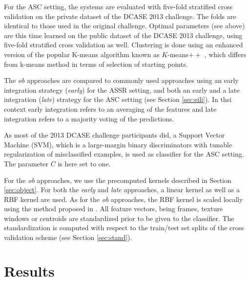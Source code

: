 \documentclass[journal]{IEEEtran}
\begin{document}
For the ASC setting, the systems are evaluated  with five-fold  stratified cross validation on the private dataset of the DCASE 2013 challenge. The folds are identical to those used in the original challenge. Optimal parameters (see above) are this time learned on the public dataset of the DCASE 2013 challenge, using five-fold  stratified cross validation as well. Clustering is done using an enhanced version of the popular K-means algorithm known as $K$-means$++$ \cite{arthur2007k}, which differs from k-means method in terms of selection of starting points. 

The \emph{ob} approaches are compared to commonly used approaches using an early integration strategy (\emph{early}) for the ASSR setting, and both an early and a late integration (\emph{late}) strategy for the ASC setting (see Section \ref{sec:eili}). In thsi context early integration refers to an averaging of the features and late integration refers to a majority voting of the predictions.

As most of the 2013 DCASE challenge participants did, a Support Vector Machine (SVM), which is a large-margin binary discriminators with tunable regularization of misclassified examples, is used as classifier for the ASC setting. The parameter $C$ is here set to one.

For the \emph{ob} approaches, we use the precomputed kernels described in Section \ref{sec:object}. For both the \emph{early} and \emph{late} approaches, a linear kernel as well as a RBF kernel are used. As for the \emph{ob} approaches, the RBF kernel is scaled locally using the method proposed in \cite{selfTuneManor2004}. All feature vectors, being frames, texture windows or centroids are standardized prior to be given to the classifier. The standardization is computed with respect to the train/test set splits of the cross validation scheme (see Section \ref{sec:stand}).

\section{Results \label{sec:results}}
\end{document}
